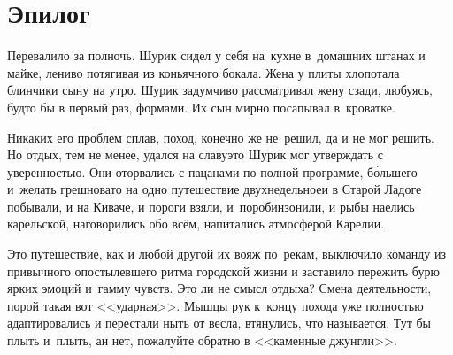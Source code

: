 
{
\cleardoublepage



\fancyhead[LE]{\fancyplain{}{}}
\fancyhead[RO]{\fancyplain{}{}}

\section*{Эпилог}


Перевалило за полночь. Шурик сидел у себя на~кухне в~домашних штанах и майке, лениво потягивая из коньячного бокала. Жена у плиты хлопотала блинчики сыну на утро. Шурик задумчиво рассматривал жену сзади, любуясь, будто бы в первый раз, формами. Их сын мирно посапывал в~кроватке. 

Никаких его проблем сплав, поход, конечно же не~решил, да и не мог решить. Но отдых, тем не менее, удался на славу\mdash это Шурик мог утверждать с уверенностью. Они оторвались с пацанами по полной программе, б\'{о}льшего и~желать грешновато на одно путешествие двухнедельное\mdash и в Старой Ладоге побывали, и на Киваче, и пороги взяли, и~поробинзонили, и рыбы наелись карельской, наговорились обо всём, напитались атмосферой Карелии.

Это путешествие, как и любой другой их вояж по~рекам, выключило команду из привычного опостылевшего ритма городской жизни и заставило пережить бурю ярких эмоций и~гамму чувств. Это ли не смысл отдыха? Смена деятельности, порой такая вот <<ударная>>. Мышцы рук к~концу похода уже полностью адаптировались и перестали ныть от весла, втянулись, что называется. Тут бы плыть и~плыть, ан нет, пожалуйте обратно в <<каменные джунгли>>.

}

